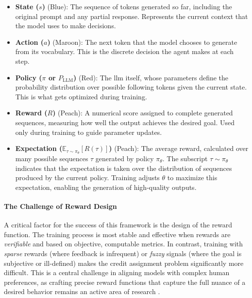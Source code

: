 \begin{tcolorbox}
\begin{itemize}
\item \textbf{State ($s$)} ({\color{StateColor}Blue}): The sequence of tokens generated so far, including the original prompt and any partial response. Represents the current context that the model uses to make decisions.

\item \textbf{Action ($a$)} ({\color{ActionColor}Maroon}): The next token that the model chooses to generate from its vocabulary. This is the discrete decision the agent makes at each step.

\item \textbf{Policy ($\pi$ or $P_{\text{LLM}}$)} ({\color{PolicyColor}Red}): The \gls{llm} itself, whose parameters define the probability distribution over possible following tokens given the current state. This is what gets optimized during training.

\item \textbf{Reward ($R$)} ({\color{RewardColor}Peach}): A numerical score assigned to complete generated sequences, measuring how well the output achieves the desired goal. Used only during training to guide parameter updates.


\item \textbf{Expectation ($\mathbb{E}_{\tau \sim \pi_{\theta}}[R(\tau)]$)} ({\color{RewardColor}Peach}): The average reward, calculated over many possible sequences $\tau$ generated by policy $\pi_{\theta}$. The subscript $\tau \sim \pi_{\theta}$ indicates that the expectation is taken over the distribution of sequences produced by the current policy. Training adjusts $\theta$ to maximize this expectation, enabling the generation of high-quality outputs.
\end{itemize}

\end{tcolorbox}

\paragraph{The Challenge of Reward Design}
A critical factor for the success of this framework is the design of the reward function. The training process is most stable and effective when rewards are \textit{verifiable} and based on objective, computable metrics. 
In contrast, training with \textit{sparse} rewards (where feedback is infrequent) or \textit{fuzzy} signals (where the goal is subjective or ill-defined) makes the credit assignment problem significantly more difficult. 
This is a central challenge in aligning models with complex human preferences, as crafting precise reward functions that capture the full nuance of a desired behavior remains an active area of research \autocite{ouyang2022training}.


